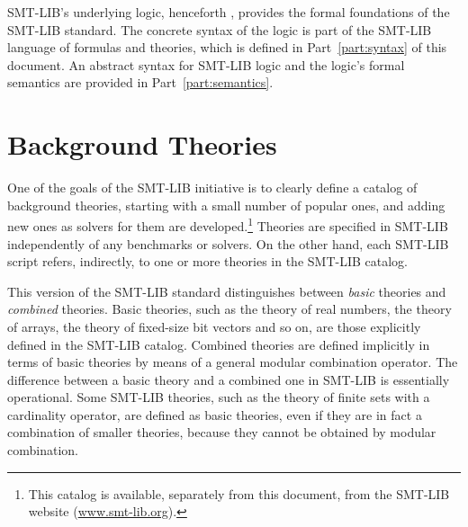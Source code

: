 SMT-LIB's underlying logic,
henceforth ,
provides the formal foundations of the SMT-LIB standard.
The concrete syntax of the logic is part of the SMT-LIB language
of formulas and theories, which is defined in Part~\ref{part:syntax} 
of this document.
An abstract syntax for SMT-LIB logic and 
the logic's formal semantics are provided in Part~\ref{part:semantics}.



\section{Background Theories}

One of the goals of the SMT-LIB initiative is 
to clearly define a catalog of background theories,
starting with a small number of popular ones,
and adding new ones as solvers for them are developed.\footnote{
This catalog is available, separately from this document,
from the SMT-LIB website (\href{http://www.smt-lib.org}{www.smt-lib.org}).
}
Theories are specified in SMT-LIB independently of any benchmarks or solvers.
On the other hand, 
each SMT-LIB script refers, indirectly, to one or more theories 
in the SMT-LIB catalog.

This version of the SMT-LIB standard distinguishes 
between \emph{basic} theories and 
\emph{combined} theories.
Basic theories,
such as the theory of real numbers, the theory of arrays, 
the theory of fixed-size bit vectors and so on,
are those explicitly defined in the SMT-LIB catalog.
Combined theories are defined implicitly in terms of basic theories 
by means of a general modular combination operator.
The difference between a basic theory and a combined one
in SMT-LIB is essentially operational.
Some SMT-LIB theories, 
such as the theory of finite sets with a cardinality operator, 
are defined as basic theories,
even if they are in fact a combination of smaller theories,
because they cannot be obtained by modular combination.
%


